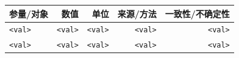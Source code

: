 \begin{tabular}{lrrrr}
\toprule
\textbf{参量/对象} & \textbf{数值} & \textbf{单位} & \textbf{来源/方法} & \textbf{一致性/不确定性} \\\midrule
\texttt{<val>} & \texttt{<val>} & \texttt{<val>} & \texttt{<val>} & \texttt{<val>} \\
\texttt{<val>} & \texttt{<val>} & \texttt{<val>} & \texttt{<val>} & \texttt{<val>} \\\bottomrule
\end{tabular}
